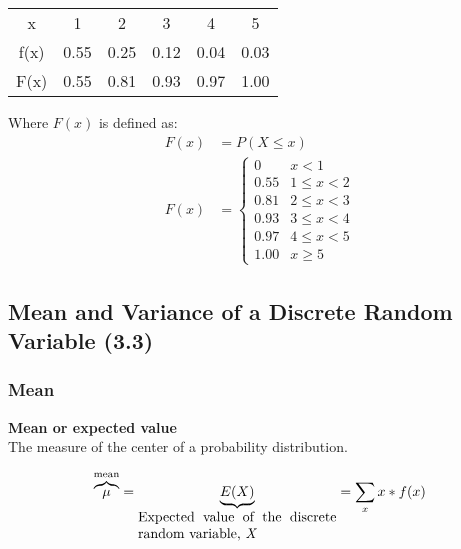 \documentclass[../INDE315.tex]{subfiles}
\begin{document}
\begin{center}
    \begin{tabular}{c c c c c c}
        x & 1 & 2 & 3 & 4 & 5 \\
        f(x) & 0.55 & 0.25 & 0.12 & 0.04 & 0.03 \\
        F(x) & 0.55 & 0.81 & 0.93 & 0.97 & 1.00 \\
    \end{tabular}        
\end{center}
Where $F(x)$ is defined as:
\begin{equation*}
    \begin{aligned}
        F(x) &= P(X \leq x) \\
        F(x) &= 
            \begin{cases}
                0 & x < 1 \\
                0.55 & 1 \leq x < 2 \\
                0.81 & 2 \leq x < 3 \\
                0.93 & 3 \leq x < 4 \\
                0.97 & 4 \leq x < 5 \\
                1.00 & x \geq 5
            \end{cases}
    \end{aligned}
\end{equation*}

\subsection*{Mean and Variance of a Discrete Random Variable (3.3)}

\subsubsection*{Mean}
\begin{defn}
    \textbf{Mean or expected value} \\
    The measure of the center of a probability distribution.
\end{defn}

\begin{equation*}
    \begin{aligned}
        \overbrace{\mu}^{\text{mean}} = \underbrace{E(X)}_{\parbox{5cm}{Expected value of the discrete random variable, \emph{X}}} = \sum_{x} x * f(x)       
    \end{aligned}
\end{equation*}
\end{document}
